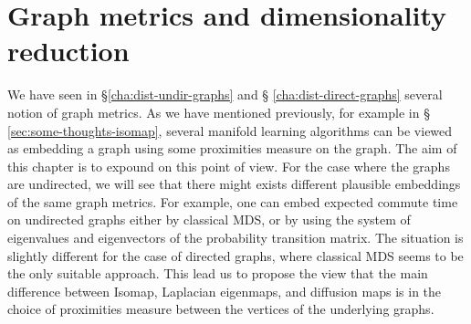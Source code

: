 \chapter{Graph metrics and dimensionality reduction}
\label{cha:graph-metr-dimens}
We have seen in \S \ref{cha:dist-undir-graphs} and \S
\ref{cha:dist-direct-graphs} several notion of graph metrics. As we
have mentioned previously, for example in \S
\ref{sec:some-thoughts-isomap}, several manifold learning algorithms
can be viewed as embedding a graph using some proximities measure on
the graph. The aim of this chapter is to expound on this point of
view. For the case where the graphs are undirected, we will see that
there might exists different plausible embeddings of the same graph
metrics. For example, one can embed expected commute time on
undirected graphs either by classical MDS, or by using the system of
eigenvalues and eigenvectors of the probability transition matrix.
The situation is slightly different for the case of directed graphs,
where classical MDS seems to be the only suitable approach. This lead
us to propose the view that the main difference between Isomap,
Laplacian eigenmaps, and diffusion maps is in the choice of
proximities measure between the vertices of the underlying graphs.

